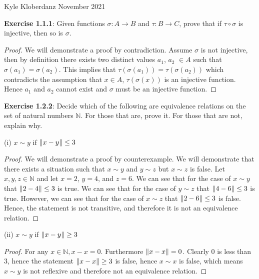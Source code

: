 \documentclass[a4paper]{article}
\DeclarePairedDelimiter{\norm}{\lVert}{\rVert}
\begin{document}
\begin{myparindent}{0pt}

Kyle Kloberdanz  November 2021 \newline

\textbf{Exercise 1.1.1}:
Given functions $\sigma: A \rightarrow B$ and $\tau: B \rightarrow C$,
prove that if $\tau \circ \sigma$ is injective, then so is $\sigma$.

\begin{proof}
We will demonstrate a proof by contradiction. Assume $\sigma$ is not injective, then by
definition there exists two distinct values $a_1$, $a_2$ $\in A$ such that
$\sigma(a_1) = \sigma(a_2)$.
This implies that $\tau(\sigma(a_1)) = \tau(\sigma(a_2))$
which contradicts the assumption that $x \in A$, $\tau(\sigma(x))$ is an injective function.
Hence $a_1$ and $a_2$ cannot exist and $\sigma$ must be an injective function.
\end{proof}

\textbf{Exercise 1.2.2}:
Decide which of the following are equivalence relations on the set of natural numbers $\mathbb{N}$. For those
that are, prove it. For those that are not, explain why. \newline
\newline

(i) $x \sim y$ if $\norm{x - y} \le 3$ \newline
\begin{proof}
We will demonstrate a proof by counterexample.
We will demonstrate that there exists a situation such that $x \sim y$ and $y \sim z$ but $x \sim z$ is false.
Let $x, y, z \in \mathbb{N}$ and let $x = 2$, $y = 4$, and $z = 6$. \newline
\newline
We can see that for the case of $x \sim y$ that $\norm{2 - 4} \le 3$ is true. \newline
We can see that for the case of $y \sim z$ that $\norm{4 - 6} \le 3$ is true. \newline
However, we can see that for the case of $x \sim z$ that $\norm{2 - 6} \le 3$ is false. \newline
Hence, the statement is not transitive, and therefore it is not an equivalence relation.
\end{proof}

(ii) $x \sim y$ if $\norm{x - y} \ge 3$ \newline
\begin{proof}
For any $x \in \mathbb{N}, x - x = 0$. Furthermore $\norm{x - x} = 0$. Clearly 0 is less than 3,
hence the statement $\norm{x - x} \ge 3$ is false,
hence $x \sim x$ is false, which means $x \sim y$ is not reflexive and therefore not an equivalence relation. \newline
\end{proof}


\end{myparindent}
\end{document}
